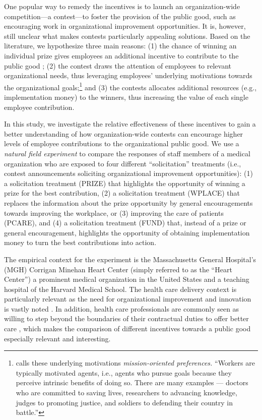 \documentclass[12pt, titlepage]{article}
\begin{document}
One popular way to remedy the incentives is to launch an
organization-wide competition---a contest---to foster the provision of
the public good, such as encouraging work in organizational improvement
opportunities. It is, however, still unclear what makes contests
particularly appealing solutions. Based on the literature, we
hypothesize three main reasons: (1) the chance of winning an individual
prize gives employees an additional incentive to contribute to the
public good \citep{morgan2000financing}; (2) the contest draws the
attention of employees to relevant organizational needs, thus leveraging
employees' underlying motivations towards the organizational
goals;\footnote{\citet{besley2005competition} calls these underlying
  motivations \emph{mission-oriented preferences.} ``Workers are
  typically motivated agents, i.e., agents who pursue goals because they
  perceive intrinsic benefits of doing so. There are many examples ---
  doctors who are committed to saving lives, researchers to advancing
  knowledge, judges to promoting justice, and soldiers to defending
  their country in battle.''} and (3) the contests allocates additional
resources (e.g., implementation money) to the winners, thus increasing
the value of each single employee contribution.

In this study, we investigate the relative effectiveness of these
incentives to gain a better understanding of how organization-wide
contests can encourage higher levels of employee contributions to the
organizational public good. We use a \emph{natural field experiment} to
compare the responses of staff members of a medical organization who are
exposed to four different ``solicitation'' treatments (i.e., contest
announcements soliciting organizational improvement opportunities): (1)
a solicitation treatment (PRIZE) that highlights the opportunity of
winning a prize for the best contribution, (2) a solicitation treatment
(WPLACE) that replaces the information about the prize opportunity by
general encouragements towards improving the workplace, or (3) improving
the care of patients (PCARE), and (4) a solicitation treatment (FUND)
that, instead of a prize or general encouragement, highlights the
opportunity of obtaining implementation money to turn the best
contributions into action.

The empirical context for the experiment is the Massachusetts General
Hospital's (MGH) Corrigan Minehan Heart Center (simply referred to as
the ``Heart Center'') a prominent medical organization in the United
States and a teaching hospital of the Harvard Medical School. The health
care delivery context is particularly relevant as the need for
organizational improvement and innovation is vastly noted
\citep{cutler2012reducing}. In addition, health care professionals are
commonly seen as willing to step beyond the boundaries of their
contractual duties to offer better care \citep{delfgaauw2005dedicated},
which makes the comparison of different incentives towards a public good
especially relevant and interesting.
\end{document}
